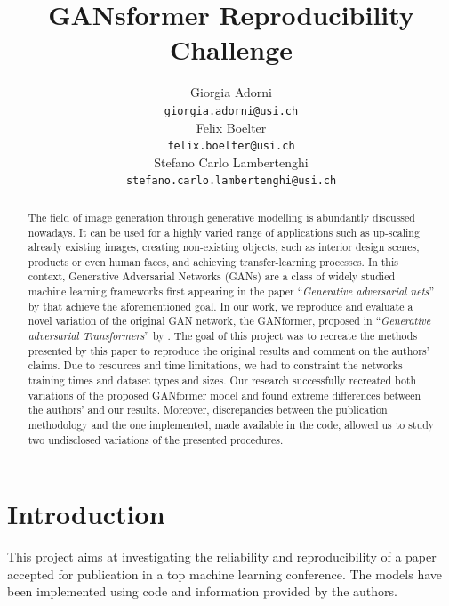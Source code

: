 \documentclass{article}
\title{GANsformer Reproducibility Challenge}
\author{%
Giorgia Adorni \\
\texttt{giorgia.adorni@usi.ch} \\
\And
Felix Boelter\\
\texttt{felix.boelter@usi.ch}\\
\And
Stefano Carlo Lambertenghi\\
\texttt{stefano.carlo.lambertenghi@usi.ch}\\
}
\begin{document}
\maketitle
\begin{abstract}
	The field of image generation through generative modelling is abundantly discussed nowadays. It 
	can be used for a highly varied range of applications such as up-scaling 
	already existing images, creating non-existing objects, such as interior design scenes,
	products or even human faces, and achieving transfer-learning processes. 
	In this context, Generative Adversarial Networks (GANs) are a class of widely studied machine 
	learning frameworks first appearing in the paper ``\emph{Generative adversarial nets}'' by 
	\citet{goodfellow2014generative} that achieve the aforementioned goal. 
	In our work, we reproduce and evaluate a novel variation of the original GAN network, the 
	GANformer, proposed in ``\emph{Generative adversarial Transformers}'' by 
	\citet{hudson2021generative}. 
	The goal of this project was to recreate the methods presented by this paper to reproduce the 
	original results and comment on the authors’ claims. 
	Due to resources and time limitations, we had to constraint the networks training times and 
	dataset types and sizes. 
	Our research successfully recreated both variations of the proposed GANformer model and found 
	extreme differences between the authors’ and our results. 
	Moreover, discrepancies between the publication methodology and the one implemented, 
	made available in the code, allowed us to study two undisclosed variations of the presented 
	procedures.
\end{abstract}

\section{Introduction}
This project aims at investigating the reliability and reproducibility of a paper accepted 
for publication in a top machine learning conference. The models have been implemented 
using code and information provided by the authors.
\end{document}
